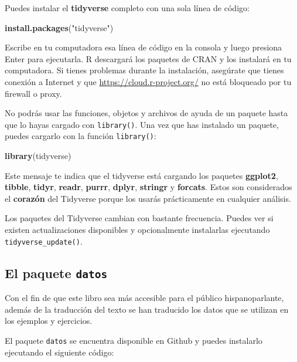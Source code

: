 \documentclass[11pt,oneside]{report}
\newenvironment{Shaded}{\begin{snugshade}}{\end{snugshade}}
\newcommand{\KeywordTok}[1]{\textcolor[rgb]{0.13,0.29,0.53}{\textbf{#1}}}
\newcommand{\NormalTok}[1]{#1}
\newcommand{\StringTok}[1]{\textcolor[rgb]{0.31,0.60,0.02}{#1}}
\begin{document}
Puedes instalar el \textbf{tidyverse} completo con una sola línea de
código:

\begin{Shaded}
\begin{Highlighting}[]
\KeywordTok{install.packages}\NormalTok{(}\StringTok{"tidyverse"}\NormalTok{)}
\end{Highlighting}
\end{Shaded}

Escribe en tu computadora esa línea de código en la consola y luego
presiona Enter para ejecutarla. R descargará los paquetes de CRAN y los
instalará en tu computadora. Si tienes problemas durante la instalación,
asegúrate que tienes conexión a Internet y que
\url{https://cloud.r-project.org/} no está bloqueado por tu firewall o
proxy.

No podrás usar las funciones, objetos y archivos de ayuda de un paquete
hasta que lo hayas cargado con \texttt{library()}. Una vez que has
instalado un paquete, puedes cargarlo con la función \texttt{library()}:

\begin{Shaded}
\begin{Highlighting}[]
\KeywordTok{library}\NormalTok{(tidyverse)}
\end{Highlighting}
\end{Shaded}

Este mensaje te indica que el tidyverse está cargando los paquetes
\textbf{ggplot2}, \textbf{tibble}, \textbf{tidyr}, \textbf{readr},
\textbf{purrr}, \textbf{dplyr}, \textbf{stringr} y \textbf{forcats}.
Estos son considerados el \textbf{corazón} del Tidyverse porque los
usarás prácticamente en cualquier análisis.

Los paquetes del Tidyverse cambian con bastante frecuencia. Puedes ver
si existen actualizaciones disponibles y opcionalmente instalarlas
ejecutando \texttt{tidyverse\_update()}.

\hypertarget{el-paquete-datos}{%
\subsection{\texorpdfstring{El paquete
\texttt{datos}}{El paquete datos}}\label{el-paquete-datos}}

Con el fin de que este libro sea más accesible para el público
hispanoparlante, además de la traducción del texto se han traducido los
datos que se utilizan en los ejemplos y ejercicios.

El paquete \texttt{datos} se encuentra disponible en Github y puedes
instalarlo ejecutando el siguiente código:
\end{document}
